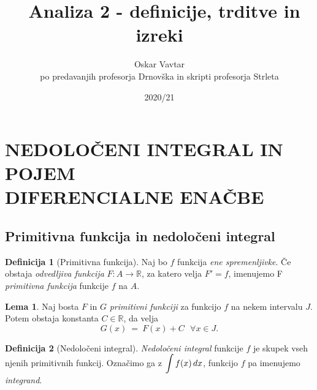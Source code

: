 \documentclass[11pt]{article}
\title{\Left\Homer ~Analiza 2 - definicije, trditve in izreki \Bart}
\author{Oskar Vavtar \\
po predavanjih profesorja Drnovška in skripti profesorja Strleta}
\date{2020/21}
\theoremstyle{definition}
\newtheorem{definicija}{Definicija}[section]
\theoremstyle{definition}
\theoremstyle{definition}
\theoremstyle{theorem}
\newtheorem{lema}{Lema}
\begin{document}
\maketitle
\pagebreak
\tableofcontents
\pagebreak


\section{NEDOLOČENI INTEGRAL IN POJEM \\ DIFERENCIALNE ENAČBE}
\vspace{0.5cm}


\subsection{Primitivna funkcija in nedoločeni integral}
\vspace{0.5cm}

\begin{definicija}[Primitivna funkcija]

Naj bo $f$ funkcija \textit{ene spremenljivke}. Če obstaja \textit{odvedljiva funkcija} $F: A \rightarrow \mathbb{R}$, za katero velja $F' = f$, imenujemo F \textit{primitivna funkcija} funkcije $f$ na $A$. 

\end{definicija}
\vspace{0.5cm}

\begin{lema}

Naj bosta $F$ in $G$ \textit{primitivni funkciji} za funkcijo $f$ na nekem intervalu $J$. Potem obstaja konstanta $C \in \mathbb{R}$, da velja 
$$G(x) ~=~ F(x) + C ~~~ \forall x \in J.$$

\end{lema}
\vspace{0.5cm}

\begin{definicija}[Nedoločeni integral]

\textit{Nedoločeni integral} funkcije $f$ je \hbox{skupek} vseh njenih primitivnih funkcij. Označimo ga z $\mathlarger{\int f(x)\,dx}$, funkcijo $f$ pa imenujemo \textit{integrand}.

\end{definicija}
\vspace{0.5cm}
\end{document}
